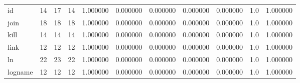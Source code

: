 \begin{tabular}{lrrrrrrrrrr}
id        &                                      14 &                 17 &                                14 &                                   1.000000 &                               0.000000 &                                     0.000000 &                          0.000000 &                                0.000000 &                                1.0 &                                           1.000000 \\
join      &                                      18 &                 18 &                                18 &                                   1.000000 &                               0.000000 &                                     0.000000 &                          0.000000 &                                0.000000 &                                1.0 &                                           1.000000 \\
kill      &                                      14 &                 14 &                                14 &                                   1.000000 &                               0.000000 &                                     0.000000 &                          0.000000 &                                0.000000 &                                1.0 &                                           1.000000 \\
link      &                                      12 &                 12 &                                12 &                                   1.000000 &                               0.000000 &                                     0.000000 &                          0.000000 &                                0.000000 &                                1.0 &                                           1.000000 \\
ln        &                                      22 &                 23 &                                22 &                                   1.000000 &                               0.000000 &                                     0.000000 &                          0.000000 &                                0.000000 &                                1.0 &                                           1.000000 \\
logname   &                                      12 &                 12 &                                12 &                                   1.000000 &                               0.000000 &                                     0.000000 &                          0.000000 &                                0.000000 &                                1.0 &                                           1.000000 \\

\end{tabular}
